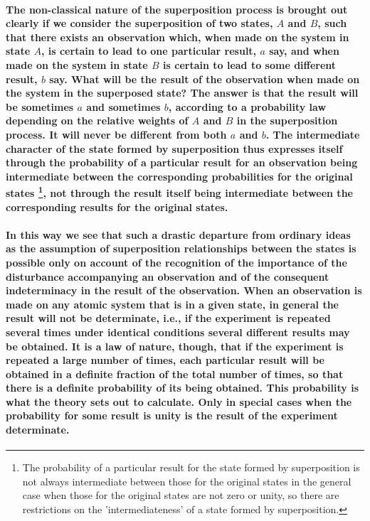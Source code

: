 \documentclass[10pt, kindle, oneside]{kindle}
\begin{document}
\paragraph{The non-classical nature of the superposition process is brought out clearly if we consider the superposition of two states, $A$ and $B$, such that there exists an observation which, when made on the system in state $A$, is certain to lead to one particular result, $a$ say, and when made on the system in state $B$ is certain to lead to some different result, $b$ say. What will be the result of the observation when made on the system in the superposed state? The answer is that the result will be sometimes $a$ and sometimes $b$, according to a probability law depending on the relative weights of $A$ and $B$ in the superposition process. It will never be different from both $a$ and $b$. The intermediate character of the state formed by superposition thus expresses itself through the probability of a particular result for an observation being intermediate between the corresponding probabilities for the original states  \footnote{ The probability of a particular result for the state formed by superposition is not always intermediate between those for the original states in the general case when those for the original states are not zero or unity, so there are restrictions on the 'intermediateness' of a state formed by superposition.}, not through the result itself being intermediate between the corresponding results for the original states.}
\paragraph{In this way we see that such a drastic departure from ordinary ideas as the assumption of superposition relationships between the states is possible only on account of the recognition of the importance of the disturbance accompanying an observation and of the consequent indeterminacy in the result of the observation. When an observation is made on any atomic system that is in a given state, in general the result will not be determinate, i.e., if the experiment is repeated several times under identical conditions several different results may be obtained. It is a law of nature, though, that if the experiment is repeated a large number of times, each particular result will be obtained in a definite fraction of the total number of times, so that there is a definite probability of its being obtained. This probability is what the theory sets out to calculate. Only in special cases when the probability for some result is unity is the result of the experiment determinate.}
\end{document}
